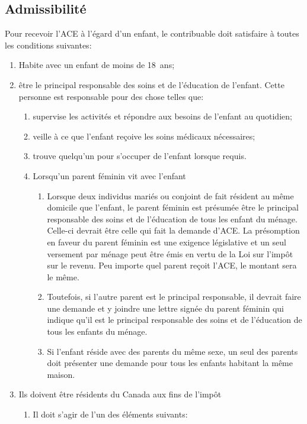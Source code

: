 \subsection{Admissibilité}
Pour recevoir l'ACE à l'égard d'un enfant, le contribuable doit satisfaire à toutes les conditions suivantes:
\begin{enumerate}
	\item Habite avec un enfant de moins de 18~ans;
	\item être le principal responsable des soins et de l'éducation de l'enfant. Cette personne est responsable pour des chose telles que:
	\begin{enumerate}
		\item supervise les activités et répondre aux besoins de l'enfant au quotidien;
		\item veille à ce que l'enfant reçoive les soins médicaux nécessaires;
		\item trouve quelqu'un pour s'occuper de l'enfant lorsque requis.
		\item Lorsqu'un parent féminin vit avec l'enfant
		\begin{enumerate}
			\item Lorsque deux individus mariés ou conjoint de fait résident au même domicile que l'enfant, le parent féminin est présumée être le principal responsable des soins et de l'éducation de tous les enfant du ménage. Celle-ci devrait être celle qui fait la demande d'ACE. La présomption en faveur du parent féminin est une exigence législative et un seul versement par ménage peut être émis en vertu de la Loi sur l'impôt sur le revenu. Peu importe quel parent reçoit l'ACE, le montant sera le même.
			\item Toutefois, si l'autre parent est le principal responsable, il devrait faire une demande et y joindre une lettre signée du parent féminin qui indique qu'il est le principal responsable des soins et de l'éducation de tous les enfants du ménage.
			\item Si l'enfant réside avec des parents du même sexe, un seul des parents doit présenter une demande pour tous les enfants habitant la même maison.
		\end{enumerate}
	\end{enumerate}
	\item Ils doivent être résidents du Canada aux fins de l'impôt
	\begin{enumerate}
		\item Il doit s'agir de l'un des éléments suivants:
		\begin{enumerate}

\end{enumerate}
\end{enumerate}
\end{enumerate}

